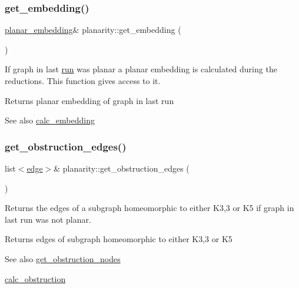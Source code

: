 \subsubsection{\texorpdfstring{get\+\_\+embedding()}{get\_embedding()}}
{\footnotesize\ttfamily \mbox{\hyperlink{classplanar__embedding}{planar\+\_\+embedding}}\& planarity\+::get\+\_\+embedding (\begin{DoxyParamCaption}{ }\end{DoxyParamCaption})\hspace{0.3cm}{\ttfamily [inline]}}



If graph in last \mbox{\hyperlink{classplanarity_a93232e765c08dd2a4c00d192bb48b5fc}{run}} was planar a planar embedding is calculated during the reductions. This function gives access to it. 

\begin{DoxyReturn}{Returns}
planar embedding of graph in last run
\end{DoxyReturn}
\begin{DoxySeeAlso}{See also}
\mbox{\hyperlink{classplanarity_a1679e285a7135b48b572764f5e8e773d}{calc\+\_\+embedding}} 
\end{DoxySeeAlso}
\mbox{\label{classplanarity_ac9021696934cc24afbc36aa307b2919b}} 
\subsubsection{\texorpdfstring{get\+\_\+obstruction\+\_\+edges()}{get\_obstruction\_edges()}}
{\footnotesize\ttfamily list$<$\mbox{\hyperlink{classedge}{edge}}$>$\& planarity\+::get\+\_\+obstruction\+\_\+edges (\begin{DoxyParamCaption}{ }\end{DoxyParamCaption})\hspace{0.3cm}{\ttfamily [inline]}}



Returns the edges of a subgraph homeomorphic to either K3,3 or K5 if graph in last run was not planar. 

\begin{DoxyReturn}{Returns}
edges of subgraph homeomorphic to either K3,3 or K5
\end{DoxyReturn}
\begin{DoxySeeAlso}{See also}
\mbox{\hyperlink{classplanarity_ac1bee50e38d398f3868a3308164caa31}{get\+\_\+obstruction\+\_\+nodes}} 

\mbox{\hyperlink{classplanarity_a7b8e8e5414a4eedb0f99253d3b62ffa3}{calc\+\_\+obstruction}} 
\end{DoxySeeAlso}
\mbox{\label{classplanarity_ac1bee50e38d398f3868a3308164caa31}} 
